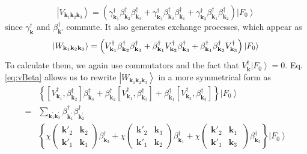 \documentclass[epj]{svjour}
\newcommand{\vk}{\ensuremath{\mathbf{k}}}
\begin{document}
\begin{equation}  \label{eq:vThree}
\left|V_{\mathbf{k} _1\mathbf{k} _2\mathbf{k} _3}\right> =
\left(\gamma^{\dagger}_{\mathbf{k} _1}\beta^{\dagger}_{\mathbf{k}
_2}\beta^{\dagger}_{\mathbf{k} _3}+\gamma^{\dagger}_{\mathbf{k}
_2}\beta^{\dagger}_{\mathbf{k} _3}\beta^{\dagger}_{\mathbf{k}
_1}+\gamma^{\dagger}_{\mathbf{k} _3}\beta^{\dagger}_{\mathbf{k}
_1}\beta^{\dagger}_{\mathbf{k} _2}\right) \left|F_0\right>   
\end{equation}
since $\gamma^{\dagger}_{\mathbf{k}}$ and $\beta^{\dagger}_{\mathbf{k}'}$ commute.  It also generates exchange processes, which appear as 
\begin{equation}
\left|W_{\mathbf{k} _1\mathbf{k} _2\mathbf{k} _3}\right> =\left(V^{\dagger}_{\mathbf{k} _1}\beta^{\dagger}_{\mathbf{k}
_2}\beta^{\dagger}_{\mathbf{k} _3}+\beta^{\dagger}_{\mathbf{k}
_1}V^{\dagger}_{\mathbf{k} _2}\beta^{\dagger}_{\mathbf{k} _3}+\beta^{%
\dagger}_{\mathbf{k} _1}\beta^{\dagger}_{\mathbf{k} _2}V^{\dagger}_{\mathbf{k%
} _3}\right) \left|F_0\right>  
\end{equation}
To calculate them, we again use commutators and the fact that $V^{\dagger}_\vk\left|F_0\right>  =0$. 
Eq. \eqref{eq:vBeta} allows us to rewrite  $\left|W_{\mathbf{k} _1\mathbf{k} _2\mathbf{k} _3}\right>$ in a more symmetrical form as
\begin{equation}  \label{eq:vThree2}
\begin{split}
&\left\{\left[V^{\dagger}_{\mathbf{k} _1},\beta^{\dagger}_{\mathbf{k} _2}%
\right]  \beta^{\dagger}_{\mathbf{k} _3}+\beta^{\dagger}_{\mathbf{k} _2}%
\left[V^{\dagger}_{\mathbf{k} _1},\beta^{\dagger}_{\mathbf{k} _3}\right] 
+\beta^{\dagger}_{\mathbf{k} _1}\left[V^{\dagger}_{\mathbf{k}
_2},\beta^{\dagger}_{\mathbf{k} _3}\right]  \right\} \left|F_0\right>   \\
=&\sum_{\vk^{\prime}_1\mathbf{k} ^{\prime}_2}\beta^{\dagger}_{\mathbf{k}
^{\prime}_1}\beta^{\dagger}_{\mathbf{k} ^{\prime}_2} \\
&\left\{\chi\left(\begin{smallmatrix}\vk'_2&\vk_2\\\vk'_1&\vk_1%
\end{smallmatrix}\right)  \beta^{\dagger}_{\mathbf{k} _3}+\chi\left(%
\begin{smallmatrix}\vk'_2&\vk_3\\\vk'_1&\vk_2\end{smallmatrix}\right) 
\beta^{\dagger}_{\mathbf{k} _1}+\chi\left(\begin{smallmatrix}\vk'_2&\vk_1\
\\\vk'_1&\vk_3\end{smallmatrix}\right)  \beta^{\dagger}_{\mathbf{k}
_2}\right\} \left|F_0\right>  
\end{split}%
\end{equation}
\end{document}
